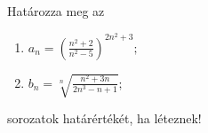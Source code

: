 \documentclass[11pt]{scrartcl}
\begin{document}
Határozza meg az
\begin{enumerate}
	\item \(\displaystyle
	      a_n = \left(
	      \frac{n^2 + 2}{n^2 - 5}
	      \right)^{2n^2 + 3};
	      \)

	\item \(\displaystyle
	      b_n = \sqrt[n]{\frac{n^2 + 3n}{2n^3 - n + 1}};
	      \)
\end{enumerate}
sorozatok határértékét, ha léteznek!
\end{document}
